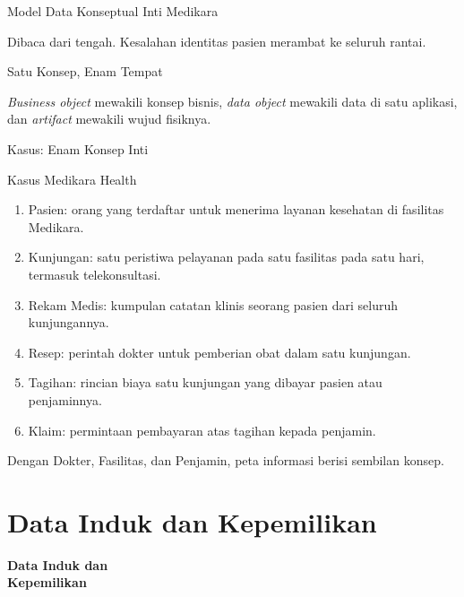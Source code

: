 \documentclass[aspectratio=169, table, 12pt]{beamer}
\begin{document}
\begin{frame}{{\Large Model Data Konseptual Inti Medikara}}
  \centering

  \vspace{4pt}
  {\small Dibaca dari tengah. Kesalahan identitas pasien merambat ke seluruh rantai.\par}
\end{frame}

\begin{frame}{{\Large Satu Konsep, Enam Tempat}}
  \centering
  {\small \textit{Business object} mewakili konsep bisnis, \textit{data object} mewakili data di satu
  aplikasi, dan \textit{artifact} mewakili wujud fisiknya.\par}
  \vspace{4pt}
\end{frame}

\begin{frame}{{\Large Kasus: Enam Konsep Inti}}
  \begin{block}{Kasus Medikara Health}
    \footnotesize
    \begin{enumerate}
      \item Pasien: orang yang terdaftar untuk menerima layanan kesehatan di fasilitas Medikara.
      \item Kunjungan: satu peristiwa pelayanan pada satu fasilitas pada satu hari, termasuk
            telekonsultasi.
      \item Rekam Medis: kumpulan catatan klinis seorang pasien dari seluruh kunjungannya.
      \item Resep: perintah dokter untuk pemberian obat dalam satu kunjungan.
      \item Tagihan: rincian biaya satu kunjungan yang dibayar pasien atau penjaminnya.
      \item Klaim: permintaan pembayaran atas tagihan kepada penjamin.
    \end{enumerate}
    Dengan Dokter, Fasilitas, dan Penjamin, peta informasi berisi sembilan konsep.
  \end{block}
\end{frame}

\section{Data Induk dan Kepemilikan}

\begin{frame}{\hfill}
  \centering
  \Huge{\textbf{Data Induk dan\\Kepemilikan}}
\end{frame}
\end{document}
